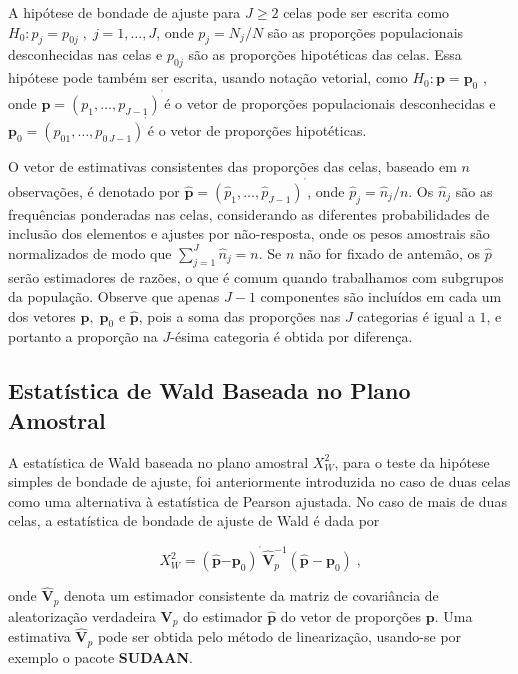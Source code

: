 \documentclass[]{book}
\theoremstyle{definition}
\theoremstyle{definition}
\theoremstyle{definition}
\theoremstyle{remark}
\begin{document}
A hipótese de bondade de ajuste para \(J\geq 2\) celas pode ser escrita
como \(H_{0}:p_{j}=p_{0j}\;,\;j=1,\ldots ,J\), onde \(p_{j}=N_{j}/N\)
são as proporções populacionais desconhecidas nas celas e \(p_{0j}\) são
as proporções hipotéticas das celas. Essa hipótese pode também ser
escrita, usando notação vetorial, como \(H_{0}:\mathbf{p=p}_{0}\) , onde
\(\mathbf{p=}\left( p_{1},\ldots ,p_{J-1}\right) ^{^{\prime}}\)é o vetor
de proporções populacionais desconhecidas e
\(\mathbf{p}_{0}\mathbf{=}\left( p_{01},\ldots ,p_{0\,J-1}\right) ^{^{\prime}}\)é
o vetor de proporções hipotéticas.

O vetor de estimativas consistentes das proporções das celas, baseado em
\(n\) observações, é denotado por
\(\widehat{\mathbf{p}}\mathbf{=}\left(\widehat{p}_{1},\ldots,\widehat{p}_{J-1}\right) ^{^{\prime}}\),
onde \(\widehat{p}_{j}=\widehat{n}_{j}/n\). Os \(\widehat{n}_{j}\) são
as frequências ponderadas nas celas, considerando as diferentes
probabilidades de inclusão dos elementos e ajustes por não-resposta,
onde os pesos amostrais são normalizados de modo que
\(\sum_{j=1}^{J}\widehat{n}_{j}=n\). Se \(n\) não for fixado de antemão,
os \(\widehat{p}\) serão estimadores de razões, o que é comum quando
trabalhamos com subgrupos da população. Observe que apenas \(J-1\)
componentes são incluídos em cada um dos vetores \(\mathbf{p,\;p}_{0}\)
e \(\widehat{\mathbf{p}}\), pois a soma das proporções nas \(J\)
categorias é igual a \(1\), e portanto a proporção na \(J\)-ésima
categoria é obtida por diferença.

\subsection{Estatística de Wald Baseada no Plano
Amostral}\label{estatistica-de-wald-baseada-no-plano-amostral}

A estatística de Wald baseada no plano amostral \(X_{W}^{2}\), para o
teste da hipótese simples de bondade de ajuste, foi anteriormente
introduzida no caso de duas celas como uma alternativa à estatística de
Pearson ajustada. No caso de mais de duas celas, a estatística de
bondade de ajuste de Wald é dada por

\begin{equation}
X_{W}^{2}=\left( \widehat{\mathbf{p}}\mathbf{-p}_{0}\right) ^{^{\prime }}
\widehat{\mathbf{V}}_{p}^{-1}\left( \widehat{\mathbf{p}}-\mathbf{p}_{0}\right) \;\mbox{,} 
\label{eq:qual8}
\end{equation}

onde \(\widehat{\mathbf{V}}_{p}\) denota um estimador consistente da
matriz de covariância de aleatorização verdadeira \(\mathbf{V}_{p}\) do
estimador \(\widehat{\mathbf{p}}\) do vetor de proporções
\(\mathbf{p}\). Uma estimativa \(\widehat{\mathbf{V}}_{p}\) pode ser
obtida pelo método de linearização, usando-se por exemplo o pacote
\textbf{SUDAAN}.
\end{document}
